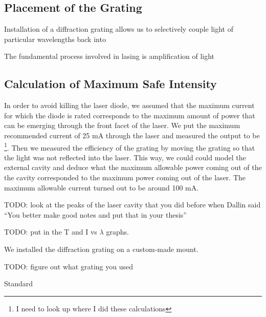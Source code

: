 \subsection{Placement of the Grating}


Installation of a diffraction grating allows us to selectively couple light of particular wavelengths back into 

The fundamental process involved in lasing is amplification of light

\subsection{Calculation of Maximum Safe Intensity}
In order to avoid killing the laser diode, we assumed that the maximum current for which the diode is rated corresponds to the maximum amount of power that can be emerging through the front facet of the laser. We put the maximum recommended current of 25 mA through the laser and measured the output to be \footnote{I need to look up where I did these calculations}. Then we measured the efficiency of the grating by moving the grating so that the light was not reflected into the laser. This way, we could could model the external cavity and deduce what the maximum allowable power coming out of the the cavity corresponded to the maximum power coming out of the laser. The maximum allowable current turned out to be around 100 mA. 


TODO: look at the peaks of the laser cavity that you did before when Dallin said ``You better make good notes and put that in your thesis''
 
TODO: put in the T and I vs $\lambda$ graphs. 

We installed the diffraction grating on a custom-made mount. 

TODO: figure out what grating you used 

Standard 




